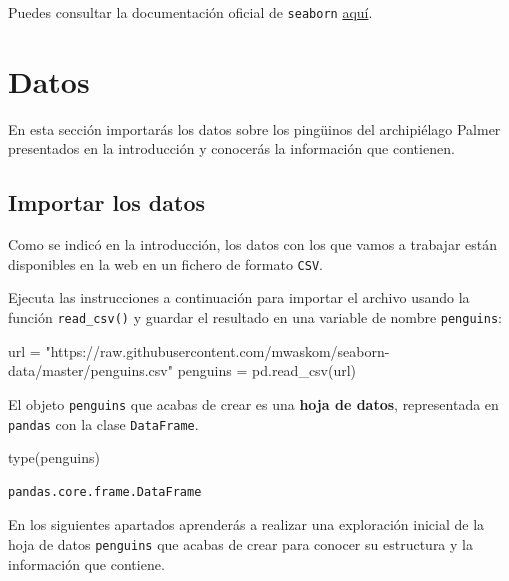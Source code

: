 \documentclass[
  a4paper,
  noprof,
  12pt,
  notoc,
  nosols,
  nobib]{mnye}
\newenvironment{Shaded}{\begin{snugshade}}{\end{snugshade}}
\newcommand{\BuiltInTok}[1]{\textcolor[rgb]{0.00,0.23,0.31}{#1}}
\newcommand{\NormalTok}[1]{\textcolor[rgb]{0.00,0.23,0.31}{#1}}
\newcommand{\OperatorTok}[1]{\textcolor[rgb]{0.37,0.37,0.37}{#1}}
\newcommand{\StringTok}[1]{\textcolor[rgb]{0.13,0.47,0.30}{#1}}
\theoremstyle{definition}
\theoremstyle{remark}
\begin{document}
Puedes consultar la documentación oficial de \texttt{seaborn}
\href{https://seaborn.pydata.org/index.html}{aquí}.


\section{Datos}\label{datos}

En esta sección importarás los datos sobre los pingüinos del
archipiélago Palmer presentados en la introducción y conocerás la
información que contienen.

\subsection{Importar los datos}\label{importar-los-datos}

Como se indicó en la introducción, los datos con los que vamos a
trabajar están disponibles en la web en un fichero de formato
\texttt{CSV}.

Ejecuta las instrucciones a continuación para importar el archivo usando
la función \texttt{read\_csv()} y guardar el resultado en una variable
de nombre \texttt{penguins}:

\begin{Shaded}
\begin{Highlighting}[]
\NormalTok{url }\OperatorTok{=} \StringTok{"https://raw.githubusercontent.com/mwaskom/seaborn{-}data/master/penguins.csv"}
\NormalTok{penguins }\OperatorTok{=}\NormalTok{ pd.read\_csv(url)}
\end{Highlighting}
\end{Shaded}

El objeto \texttt{penguins} que acabas de crear es una \textbf{hoja de
datos}, representada en \texttt{pandas} con la clase \texttt{DataFrame}.

\begin{Shaded}
\begin{Highlighting}[]
\BuiltInTok{type}\NormalTok{(penguins)}
\end{Highlighting}
\end{Shaded}

\begin{verbatim}
pandas.core.frame.DataFrame
\end{verbatim}

En los siguientes apartados aprenderás a realizar una exploración
inicial de la hoja de datos \texttt{penguins} que acabas de crear para
conocer su estructura y la información que contiene.
\end{document}
